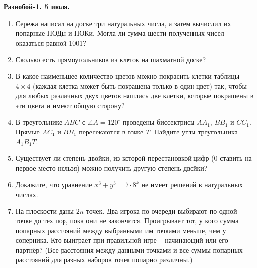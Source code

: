 \begin{center}
\Large
\textbf{Разнобой-1. 5 июля.}
\end{center}

\begin{enumerate}
\large
\item Сережа написал на доске три натуральных числа, а затем вычислил их попарные НОДы и НОКи. Могла ли сумма шести полученных чисел оказаться равной 1001?

\item Сколько есть прямоугольников из клеток на шахматной доске?

\item В какое наименьшее количество цветов можно покрасить клетки таблицы $4\times4$ (каждая клетка может быть покрашена только в один цвет) так, чтобы для любых различных двух цветов нашлись две клетки, которые покрашены в эти цвета и имеют общую сторону?

\item В треугольнике $ABC$ с $\angle A = 120^{\circ}$ проведены биссектрисы $AA_1$, $BB_1$ и $CC_1$. Прямые $AC_1$ и $BB_1$ пересекаются в точке $T$. Найдите углы треугольника $A_1B_1T$.

\item Существует ли степень двойки, из которой перестановкой цифр (0 ставить на первое место нельзя) можно получить другую степень двойки?


\item Докажите, что уравнение $x^{3}+y^{3}=7\cdot 8^{k}$ не имеет решений в натуральных числах.

\item На плоскости даны $2n$ точек. Два игрока по очереди выбирают по
одной точке до тех пор, пока они не закончатся. Проигрывает тот, у
кого сумма попарных расстояний между выбранными им точками меньше,
чем у соперника. Кто выиграет при правильной игре -- начинающий или
его партнёр? (Все расстояния между данными точками и все суммы
попарных расстояний для разных наборов точек попарно различны.)

\end{enumerate}

